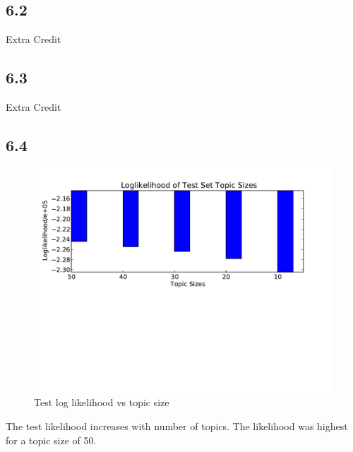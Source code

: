 \documentclass{article}
\begin{document}
\subsection*{6.2}

Extra Credit

\subsection*{6.3}

Extra Credit

\subsection*{6.4}
\begin{figure}[H]
  \caption{Test log likelihood vs topic size}
  \centering
    \includegraphics[width=1.0\textwidth]{q6_p4.pdf}
\end{figure}
The test likelihood increases with number of topics. The likelihood was highest for a topic size of 50.
\end{document}
